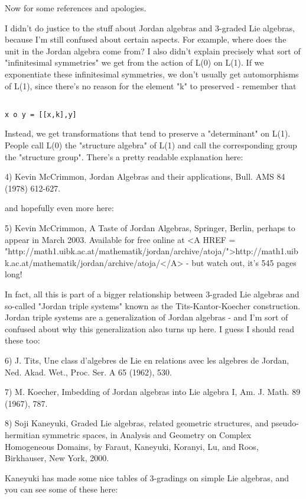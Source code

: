 Now for some references and apologies.

I didn't do justice to the stuff about Jordan algebras and 3-graded
Lie algebras, because I'm still confused about certain aspects.  For
example, where does the unit in the Jordan algebra come from?  I also
didn't explain precisely what sort of "infinitesimal
symmetries" we get from the action of L(0) on L(1).  If we
exponentiate these infinitesimal symmetries, we don't usually get
automorphisms of L(1), since there's no reason for the element
"k" to preserved - remember that


\begin{verbatim}

x o y = [[x,k],y]
\end{verbatim}
    
Instead, we get transformations that tend to preserve a "determinant"
on L(1).  People call L(0) the "structure algebra" of L(1) and call 
the corresponding group the "structure group".  There's a pretty 
readable explanation here:

4) Kevin McCrimmon, Jordan Algebras and their applications, Bull. 
AMS 84 (1978) 612-627.

and hopefully even more here:

5) Kevin McCrimmon, A Taste of Jordan Algebras, Springer, Berlin,
perhaps to appear in March 2003.  Available for free online at
<A HREF = "http://math1.uibk.ac.at/mathematik/jordan/archive/atoja/">http://math1.uibk.ac.at/mathematik/jordan/archive/atoja/</A> - but watch out,
it's 545 pages long!

In fact, all this is part of a bigger relationship between 3-graded 
Lie algebras and so-called "Jordan triple systems" known as the
Tits-Kantor-Koecher construction.  Jordan triple systems are a
generalization of Jordan algebras - and I'm sort of confused about 
why this generalization also turns up here.  I guess I should read
these too:

6) J. Tits, Une class d'algebres de Lie en relations avec les algebres
de Jordan, Ned. Akad. Wet., Proc. Ser. A 65 (1962), 530.

7) M. Koecher, Imbedding of Jordan algebras into Lie algebra I,
Am. J. Math. 89 (1967), 787. 

8) Soji Kaneyuki, Graded Lie algebras, related geometric structures,
and pseudo-hermitian symmetric spaces, in Analysis and Geometry on 
Complex Homogeneous Domains, by Faraut, Kaneyuki, Koranyi, Lu, and 
Roos, Birkhauser, New York, 2000.

Kaneyuki has made some nice tables of 3-gradings on simple Lie
algebras, and you can see some of these here:


